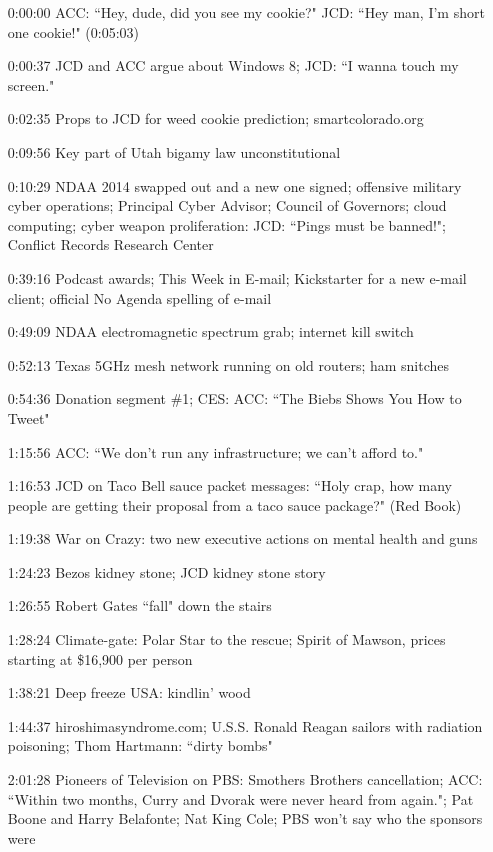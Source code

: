 \documentclass{report}
\newcommand{\mono}[1]{{\fontspec{Courier}#1}}
\begin{document}
\begin{itemize}
\item[\mono{0:00:00}] ACC: ``Hey, dude, did you see my cookie?" JCD: ``Hey man, I'm short one cookie!" (0:05:03)
\item[\mono{0:00:37}] JCD and ACC argue about Windows 8; JCD: ``I wanna touch my screen."
\item[\mono{0:02:35}] Props to JCD for weed cookie prediction; smartcolorado.org
\item[\mono{0:09:56}] Key part of Utah bigamy law unconstitutional
\item[\mono{0:10:29}] NDAA 2014 swapped out and a new one signed; offensive military cyber operations; Principal Cyber Advisor; Council of Governors; cloud computing; cyber weapon proliferation: JCD: ``Pings must be banned!"; Conflict Records Research Center
\item[\mono{0:39:16}] Podcast awards; This Week in E-mail; Kickstarter for a new e-mail client; official No Agenda spelling of e-mail
\item[\mono{0:49:09}] NDAA electromagnetic spectrum grab; internet kill switch
\item[\mono{0:52:13}] Texas 5GHz mesh network running on old routers; ham snitches
\item[\mono{0:54:36}] Donation segment \#1; CES: ACC: ``The Biebs Shows You How to Tweet"
\item[\mono{1:15:56}] ACC: ``We don't run any infrastructure; we can't afford to."
\item[\mono{1:16:53}] JCD on Taco Bell sauce packet messages: ``Holy crap, how many people are getting their proposal from a taco sauce package?" (Red Book)
\item[\mono{1:19:38}] War on Crazy: two new executive actions on mental health and guns
\item[\mono{1:24:23}] Bezos kidney stone; JCD kidney stone story
\item[\mono{1:26:55}] Robert Gates ``fall" down the stairs
\item[\mono{1:28:24}] Climate-gate: Polar Star to the rescue; Spirit of Mawson, prices starting at \$16,900 per person
\item[\mono{1:38:21}] Deep freeze USA: kindlin' wood
\item[\mono{1:44:37}] hiroshimasyndrome.com; U.S.S. Ronald Reagan sailors with radiation poisoning; Thom Hartmann: ``dirty bombs"
\item[\mono{2:01:28}] Pioneers of Television on PBS: Smothers Brothers cancellation; ACC: ``Within two months, Curry and Dvorak were never heard from again."; Pat Boone and Harry Belafonte; Nat King Cole; PBS won't say who the sponsors were

\end{itemize}
\end{document}
